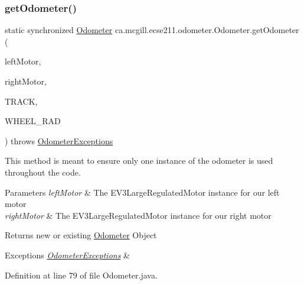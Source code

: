 \subsubsection{\texorpdfstring{get\+Odometer()}{getOdometer()}\hspace{0.1cm}{\footnotesize\ttfamily [1/2]}}
{\footnotesize\ttfamily static synchronized \hyperlink{classca_1_1mcgill_1_1ecse211_1_1odometer_1_1_odometer}{Odometer} ca.\+mcgill.\+ecse211.\+odometer.\+Odometer.\+get\+Odometer (\begin{DoxyParamCaption}\item[{E\+V3\+Large\+Regulated\+Motor}]{left\+Motor,  }\item[{E\+V3\+Large\+Regulated\+Motor}]{right\+Motor,  }\item[{final double}]{T\+R\+A\+CK,  }\item[{final double}]{W\+H\+E\+E\+L\+\_\+\+R\+AD }\end{DoxyParamCaption}) throws \hyperlink{classca_1_1mcgill_1_1ecse211_1_1odometer_1_1_odometer_exceptions}{Odometer\+Exceptions}\hspace{0.3cm}{\ttfamily [static]}}

This method is meant to ensure only one instance of the odometer is used throughout the code.


\begin{DoxyParams}{Parameters}
{\em left\+Motor} & The E\+V3\+Large\+Regulated\+Motor instance for our left motor \\
\hline
{\em right\+Motor} & The E\+V3\+Large\+Regulated\+Motor instance for our right motor \\
\hline
\end{DoxyParams}
\begin{DoxyReturn}{Returns}
new or existing \hyperlink{classca_1_1mcgill_1_1ecse211_1_1odometer_1_1_odometer}{Odometer} Object 
\end{DoxyReturn}

\begin{DoxyExceptions}{Exceptions}
{\em \hyperlink{classca_1_1mcgill_1_1ecse211_1_1odometer_1_1_odometer_exceptions}{Odometer\+Exceptions}} & \\
\hline
\end{DoxyExceptions}


Definition at line 79 of file Odometer.\+java.

